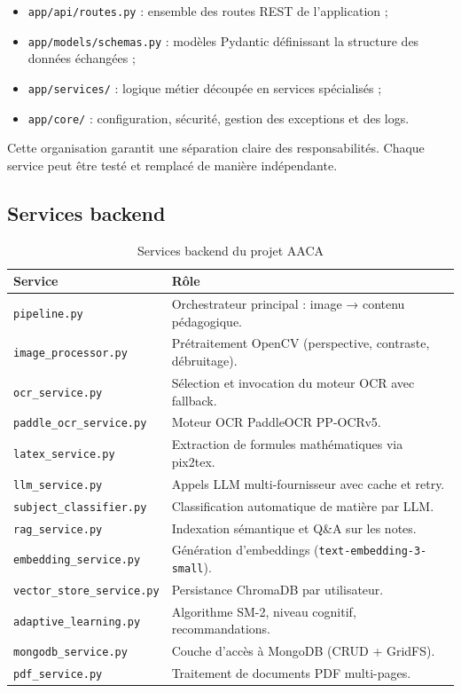 \documentclass[12pt,a4paper]{report}
\begin{document}
\begin{itemize}[label=--]
    \item \texttt{app/api/routes.py} : ensemble des routes REST de l'application ;
    \item \texttt{app/models/schemas.py} : modèles Pydantic définissant la structure des données échangées ;
    \item \texttt{app/services/} : logique métier découpée en services spécialisés ;
    \item \texttt{app/core/} : configuration, sécurité, gestion des exceptions et des logs.
\end{itemize}

Cette organisation garantit une séparation claire des responsabilités. Chaque service peut être testé et remplacé de manière indépendante.

\subsection{Services backend}

\begin{table}[H]
\centering
\begin{tabularx}{\textwidth}{|p{4.5cm}|X|}
\hline
\textbf{Service} & \textbf{Rôle}\\
\hline
\texttt{pipeline.py} & Orchestrateur principal : image → contenu pédagogique.\\
\hline
\texttt{image\_processor.py} & Prétraitement OpenCV (perspective, contraste, débruitage).\\
\hline
\texttt{ocr\_service.py} & Sélection et invocation du moteur OCR avec fallback.\\
\hline
\texttt{paddle\_ocr\_service.py} & Moteur OCR PaddleOCR PP-OCRv5.\\
\hline
\texttt{latex\_service.py} & Extraction de formules mathématiques via pix2tex.\\
\hline
\texttt{llm\_service.py} & Appels LLM multi-fournisseur avec cache et retry.\\
\hline
\texttt{subject\_classifier.py} & Classification automatique de matière par LLM.\\
\hline
\texttt{rag\_service.py} & Indexation sémantique et Q\&A sur les notes.\\
\hline
\texttt{embedding\_service.py} & Génération d'embeddings (\texttt{text-embedding-3-small}).\\
\hline
\texttt{vector\_store\_service.py} & Persistance ChromaDB par utilisateur.\\
\hline
\texttt{adaptive\_learning.py} & Algorithme SM-2, niveau cognitif, recommandations.\\
\hline
\texttt{mongodb\_service.py} & Couche d'accès à MongoDB (CRUD + GridFS).\\
\hline
\texttt{pdf\_service.py} & Traitement de documents PDF multi-pages.\\
\hline
\end{tabularx}
\caption{Services backend du projet AACA}
\label{tab:services}
\end{table}
\end{document}
